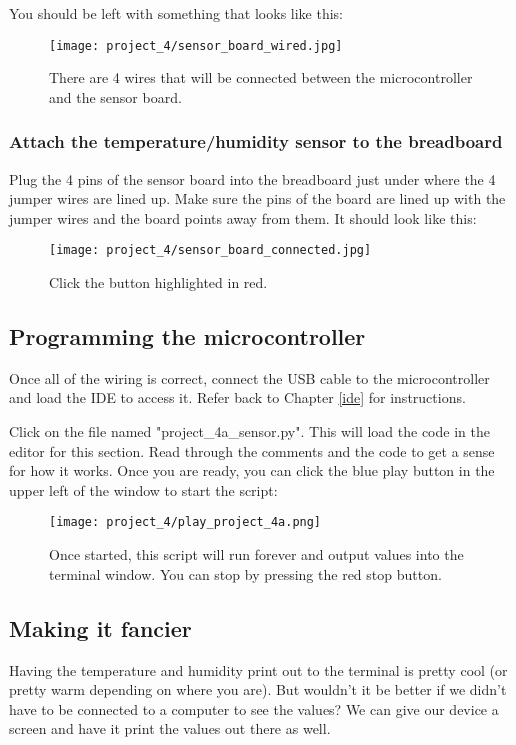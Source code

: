 You should be left with something that looks like this:
\begin{figure}[H]
    \centering
    \texttt{[image: project\_4/sensor\_board\_wired.jpg]}
    \caption{There are 4 wires that will be connected between the microcontroller and the sensor board.}
\end{figure}

\subsubsection{Attach the temperature/humidity sensor to the breadboard}
Plug the 4 pins of the sensor board into the breadboard just under where the 4 jumper wires are lined up. Make sure the pins
of the board are lined up with the jumper wires and the board points away from them. It should look like this:

\begin{figure}[H]
    \centering
    \texttt{[image: project\_4/sensor\_board\_connected.jpg]}
    \caption{Click the button highlighted in red.}
\end{figure}

\subsection{Programming the microcontroller}
Once all of the wiring is correct, connect the USB cable to the microcontroller and load the IDE to
access it. Refer back to Chapter \ref{ide} for instructions.

Click on the file named "project\_4a\_sensor.py". This will load the code in the editor for this section. Read through the comments
and the code to get a sense for how it works. Once you are ready, you can click the blue play button in the upper left of the window to start the script:
\begin{figure}[H]
    \centering
    \texttt{[image: project\_4/play\_project\_4a.png]}
    \caption{Once started, this script will run forever and output values into the terminal window. You can stop by pressing the red stop button.}
\end{figure}

\subsection{Making it fancier}
Having the temperature and humidity print out to the terminal is pretty cool (or pretty warm depending on where you are).
But wouldn't it be better if we didn't have to be connected to a computer to see the values? We can give our device a screen and have it print the values out there as well.

